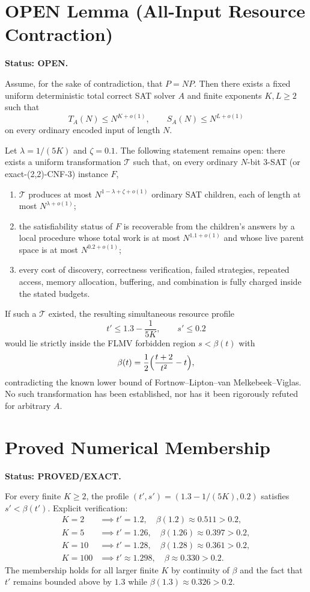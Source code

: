 \documentclass{article}
\begin{document}
\section*{OPEN Lemma (All-Input Resource Contraction)}
\textbf{Status: OPEN.}

Assume, for the sake of contradiction, that \(P = NP\). Then there exists a fixed uniform deterministic total correct SAT solver \(A\) and finite exponents \(K, L \ge 2\) such that
\[
T_A(N) \le N^{K+o(1)}, \qquad S_A(N) \le N^{L+o(1)}
\]
on every ordinary encoded input of length \(N\).

Let \(\lambda = 1/(5K)\) and \(\zeta = 0.1\). The following statement remains open: there exists a uniform transformation \(\mathcal{T}\) such that, on every ordinary \(N\)-bit 3-SAT (or exact-(2,2)-CNF-3) instance \(F\),
\begin{enumerate}
\item \(\mathcal{T}\) produces at most \(N^{1-\lambda+\zeta+o(1)}\) ordinary SAT children, each of length at most \(N^{\lambda+o(1)}\);
\item the satisfiability status of \(F\) is recoverable from the children's answers by a local procedure whose total work is at most \(N^{1.1+o(1)}\) and whose live parent space is at most \(N^{0.2+o(1)}\);
\item every cost of discovery, correctness verification, failed strategies, repeated access, memory allocation, buffering, and combination is fully charged inside the stated budgets.
\end{enumerate}
If such a \(\mathcal{T}\) existed, the resulting simultaneous resource profile
\[
t' \le 1.3 - \frac{1}{5K}, \qquad s' \le 0.2
\]
would lie strictly inside the FLMV forbidden region \(s < \beta(t)\) with
\[
\beta(t) = \frac12\Bigl(\frac{t+2}{t^2}-t\Bigr),
\]
contradicting the known lower bound of Fortnow–Lipton–van Melkebeek–Viglas. No such transformation has been established, nor has it been rigorously refuted for arbitrary \(A\).

\section*{Proved Numerical Membership}
\textbf{Status: PROVED/EXACT.}

For every finite \(K \ge 2\), the profile \((t', s') = (1.3 - 1/(5K), 0.2)\) satisfies \(s' < \beta(t')\). Explicit verification:
\begin{align*}
K=2 &\implies t'=1.2, \quad \beta(1.2)\approx 0.511 > 0.2,\\
K=5 &\implies t'=1.26, \quad \beta(1.26)\approx 0.397 > 0.2,\\
K=10 &\implies t'=1.28, \quad \beta(1.28)\approx 0.361 > 0.2,\\
K=100 &\implies t'\approx 1.298, \quad \beta\approx 0.330 > 0.2.
\end{align*}
The membership holds for all larger finite \(K\) by continuity of \(\beta\) and the fact that \(t'\) remains bounded above by \(1.3\) while \(\beta(1.3)\approx 0.326 > 0.2\).
\end{document}
